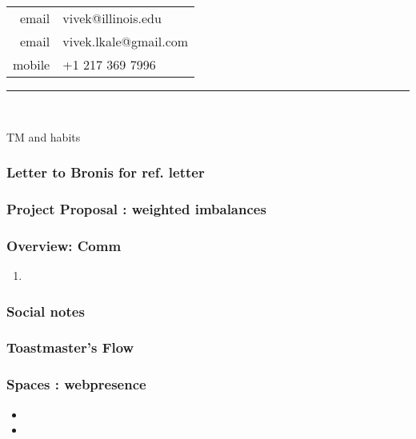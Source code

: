 {\begin{Spacing}{0.75}
\begin{minipage}[t]{42mm}
\begin{flushleft}
{\begin{tabular}{rl}
            {\color{gray}email} & vivek@illinois.edu\\
            {\color{gray}email} & vivek.lkale@gmail.com\\
            {\color{gray}mobile} & +1 217 369 7996 \\
            \end{tabular}
            \vspace*{2mm}
        }
        \end{flushleft}
    \end{minipage}
    \rule{74mm}{0mm}\\
    \end{Spacing}

}


\begin{frame}
  TM and habits 


\end{frame} 

\begin{frame} 
  \frametitle{Letter to Bronis for ref. letter} 
\end{frame} 

\begin{frame}
  \frametitle{Project Proposal : weighted imbalances}
\end{frame} 


\begin{frame}
  \frametitle{Overview: Comm}
  \begin{enumerate}
    \tiny \item \tiny 
  \end{enumerate}
\end{frame}

\begin{frame}
  \frametitle{Social notes}
\end{frame}



\begin{frame}
  \frametitle{Toastmaster's Flow}
\end{frame}

\begin{frame}[label=webpresence] 
  \frametitle{Spaces : webpresence}
  \begin{itemize}
    \tiny \item \tiny 
  \item \tiny 
  \end{itemize} 
\end{frame}

